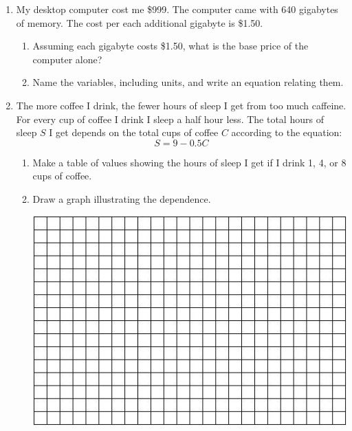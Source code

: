 \documentclass[12pt]{article}
\begin{document}
\begin{enumerate}
\item My desktop computer cost me \$999.  The computer came with 640 gigabytes of memory.  The cost per each additional gigabyte is \$1.50.  

\begin{enumerate}
\item Assuming each gigabyte costs \$1.50, what is the base price of the computer alone?
\vfill

\item Name the variables, including units, and write an equation relating them.
\vfill
\vfill
\end{enumerate}

\newpage %
\item The more coffee I drink, the fewer hours of sleep I get from too much caffeine.  For every cup of coffee I drink I sleep a half hour less.  The total hours of sleep $S$ I get depends on the total cups of coffee $C$ according to the equation: $$S=9-0.5C$$

\begin{enumerate}
\item Make a table of values showing the hours of sleep I get if I drink 1, 4, or 8 cups of coffee. 
\vfill
\vfill
\item Draw a graph illustrating the dependence.  

\vspace{.1in}
\begin{center}
 {\includegraphics [width = 6in] {../GraphPaper}}
\end{center}
\vspace{.1in}


\end{enumerate}
\end{enumerate}
\end{document}
